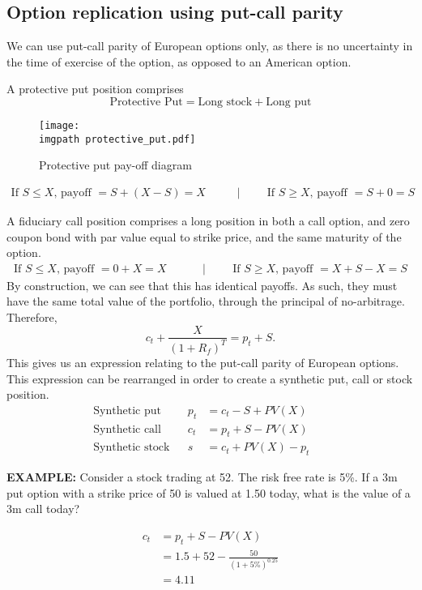 \documentclass[../notes_compiled.tex]{subfiles}
\begin{document}
\subsection{Option replication using put-call parity}
\begin{itemize}
\item We can use put-call parity of European options only, as there is no uncertainty in the time of exercise of the option, as opposed to an American option.
\item A protective put position comprises
\begin{equation}
\text{Protective Put} = \text{Long stock} + \text{Long put}
\end{equation}
\begin{figure}[h]
  \centering
  \texttt{[image: \\imgpath protective\_put.pdf]}
  \caption{Protective put pay-off diagram}
\end{figure}
\begin{align*}
\text{If $S\leq X$, payoff } =  S + (X-S) = X \hspace{1cm} &| \hspace{1cm} \text{If $S\geq X$, payoff } =  S + 0 = S
\end{align*}
\item A fiduciary call position comprises a long position in both a call option, and zero coupon bond with par value equal to strike price, and the same maturity of the option.
\begin{align*}
\text{If $S\leq X$, payoff } =  0 + X = X \hspace{1cm} &| \hspace{1cm} \text{If $S\geq X$, payoff } =  X + S - X = S
\end{align*}
By construction, we can see that this has identical payoffs. As such, they must have the same total value of the portfolio, through the principal of no-arbitrage. Therefore,
\begin{equation}
c_{t} + \frac{X}{(1+R_{f})^{T}} = p_{t} + S. \label{put-call-parity}
\end{equation}
This gives us an expression relating to the put-call parity of European options. This expression can be rearranged in order to create a synthetic put, call or stock position.
\begin{align}
\text{Synthetic put}\phantom{s}&& p_{t} &= c_{t} - S + PV(X) &&\\
\text{Synthetic call}\phantom{s}&& c_{t} &= p_{t} + S - PV(X) &&\\
\text{Synthetic stock}&& s &= c_{t} + PV(X) - p_{t} &&
\end{align}
{\color{RedViolet}
\item[] \textbf{EXAMPLE:} Consider a stock trading at 52. The risk free rate is 5\%. If a 3m put option with a strike price of 50 is valued at 1.50 today, what is the value of a 3m call today?
}
{\color{RoyalBlue}
\begin{align*}
c_{t} &= p_{t} + S - PV(X) \\
&=1.5+52-\frac{50}{(1+5\%)^{0.25}} \\
&=4.11
\end{align*}
}
\end{itemize}
\end{document}
